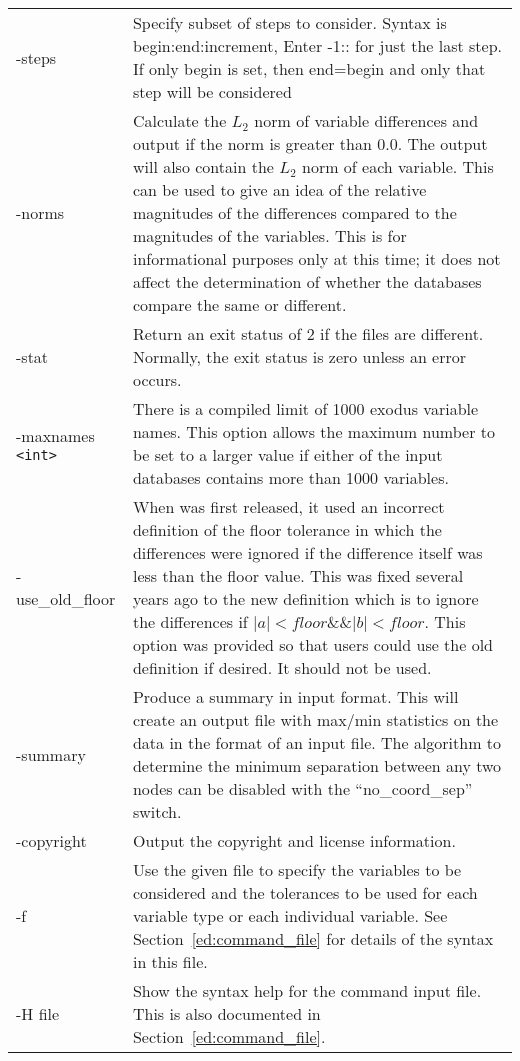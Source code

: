 \begin{longtable}{lp{4.0in}}
-steps {\tt <b:e:i>}& Specify subset of steps to consider. Syntax is begin:end:increment,
	Enter -1:: for just the last step. If only begin is set, then
	end=begin and only that step will be considered \\

-norms& Calculate the $L_2$ norm of variable differences and output if
	the norm is greater than 0.0. The output will also contain the
	$L_2$ norm of each variable.  This can be used to give an idea of
	the relative magnitudes of the differences compared to the magnitudes
	of the variables.  This is for informational purposes only at
	this time; it does not affect the determination of whether the
	databases compare the same or different.\\

-stat & Return an exit status of 2 if the files are different.  Normally,
        the exit status is zero unless an error occurs. \\

-maxnames {\tt <int>}& There is a compiled limit of 1000 exodus
	variable names. This option allows the maximum number to be
	set to a larger value if either of the input databases contains more
	than 1000 variables. \\

-use\_old\_floor& When \exodiff{} was first released, it used an
	incorrect definition of the floor tolerance in which the differences
	were ignored if the difference itself was less than the floor
	value. This was fixed several years ago to the new definition which is
	to ignore the differences if $|a| < floor \&\& |b| < floor$. This
	option was provided so that users could use the old definition
	if desired.  It should not be used. \\

-summary & Produce a summary in \exodiff{} input format.  This will
	create an output file with max/min statistics on the data in the
	format of an \exodiff{} input file.  The algorithm to determine
	the minimum separation between any two nodes can be disabled with
	the ``no\_coord\_sep'' switch. \\

-copyright & Output the copyright and license information. \\

-f {\tt <cmd file>} & Use the given file to specify the variables to 
	be considered and the tolerances to be used for
	each variable type or each individual variable. See
	Section~\ref{ed:command_file} for details of the syntax in this file.\\

-H file & Show the syntax help for the command input file.  This is
	also documented in Section~\ref{ed:command_file}.\\
\end{longtable}

